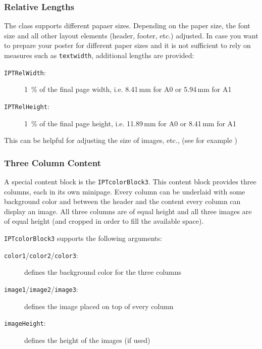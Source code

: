 \subsubsection{Relative Lengths}

The \tugPoster{} class supports different papaer sizes. Depending on the paper size, the font size and all other layout elements (header, footer, etc.) adjusted. In case you want to prepare your poster for different paper sizes and it is not sufficient to rely on measures such as \texttt{\bs{}textwidth}, additional lengths are provided:

\begin{description}
	\item[\texttt{IPTRelWidth}:] 1~\% of the final page width, i.e. 8.41\,mm for A0 or 5.94\,mm for A1
	\item[\texttt{IPTRelHeight}:] 1~\% of the final page height, i.e. 11.89\,mm for A0 or 8.41\,mm for A1
\end{description}

This can be helpful for adjusting the size of images, etc., (see for example )

\subsubsection{Three Column Content}

A special content block is the \texttt{\bs{}IPTcolorBlock3}. This content block provides three columns, each in its own minipage. Every column can be underlaid with some background color and between the header and the content every column can display an image. All three columns are of equal height and all three images are of equal height (and cropped in order to fill the available space).

\texttt{IPTcolorBlock3} supports the following arguments:
\begin{description}
	\item[\texttt{color1}/\texttt{color2}/\texttt{color3}:] defines the background color for the three columns
	\item[\texttt{image1}/\texttt{image2}/\texttt{image3}:] defines the image placed on top of every column
	\item[\texttt{imageHeight}:] defines the height of the images (if used)
\end{description}


